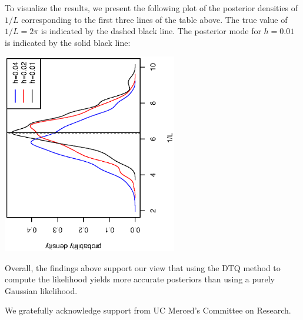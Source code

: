 \documentclass[graybox]{svmult}
\begin{document}
To visualize the results, we present the following plot of the posterior densities of $1/L$ corresponding to the first three lines of the table above.  The true value of $1/L = 2 \pi$ is indicated by the dashed black line.  The posterior mode for $h = 0.01$ is indicated by the solid black line:
\vspace{-0.6in}
\begin{center}
\includegraphics[width=3in,angle=270]{densities.eps}
\end{center}
\vspace{-0.1in}
Overall, the findings above support our view that using the DTQ method to compute the likelihood yields more accurate posteriors than using a purely Gaussian likelihood.

\begin{acknowledgement}
We gratefully acknowledge support from UC Merced's Committee on Research.
\end{acknowledgement}



\end{document}
